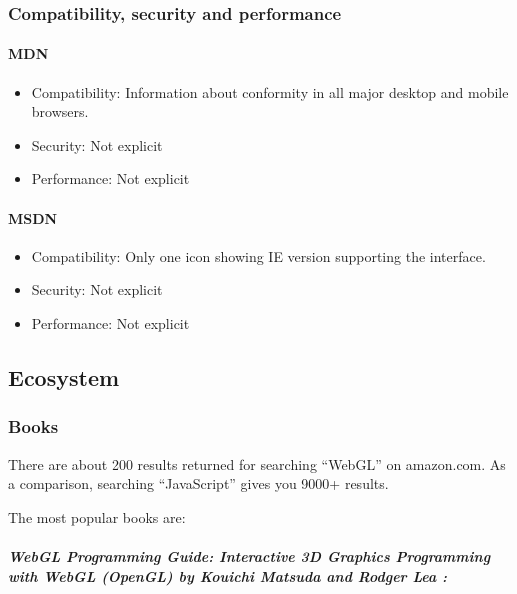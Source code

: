 \documentclass[]{article}
\begin{document}
\subsubsection{Compatibility, security and
performance}\label{compatibility-security-and-performance}

\paragraph{MDN}\label{mdn-1}

\begin{itemize}
\itemsep1pt\parskip0pt
\item
  Compatibility: Information about conformity in all major desktop and
  mobile browsers.
\item
  Security: Not explicit
\item
  Performance: Not explicit
\end{itemize}

\paragraph{MSDN}\label{msdn-1}

\begin{itemize}
\itemsep1pt\parskip0pt
\item
  Compatibility: Only one icon showing IE version supporting the
  interface.
\item
  Security: Not explicit
\item
  Performance: Not explicit
\end{itemize}

\subsection{Ecosystem}\label{ecosystem}

\subsubsection{Books}\label{books}

There are about 200 results returned for searching ``WebGL'' on
amazon.com. As a comparison, searching ``JavaScript'' gives you 9000+
results.

The most popular books are:

\subparagraph{\emph{WebGL Programming Guide: Interactive 3D Graphics
Programming with WebGL (OpenGL)} by Kouichi Matsuda and Rodger Lea
\cite{webglbook2013matsuda}:}\label{webgl-programming-guide-interactive-3d-graphics-programming-with-webgl-opengl-by-kouichi-matsuda-and-rodger-lea-webglbook2013matsuda}
\end{document}
